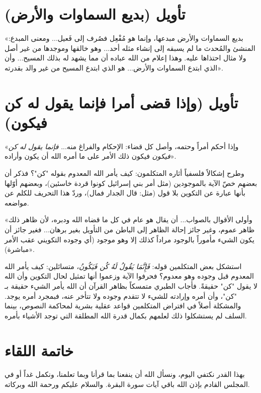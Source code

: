 \separator

\section{تأويل (بديع السماوات والأرض)}
 «بديع السماوات والأرض مبدعها، وإنما هو مُفْعِل فصُرف إلى فَعيل... ومعنى المبدع: المنشئ والمُحدث ما لم يسبقه إلى إنشاء مثله أحد... وهو خالقها وموجدها من غير أصل ولا مثال احتذاها عليه. وهذا إعلام من الله عباده أن مما يشهد له بذلك المسيح... وأن الذي ابتدع السماوات والأرض... هو الذي ابتدع المسيح من غير والد بقدرته».

\separator

\section{تأويل (وإذا قضى أمرا فإنما يقول له كن فيكون)}
 «وإذا أحكم أمراً وحتمه، وأصل كل قضاء: الإحكام والفراغ منه... \textit{فإنما يقول له كن فيكون} فيكون ذلك الأمر على ما أمره الله أن يكون وأراده».

وطرح  إشكالاً فلسفياً أثاره المتكلمون: كيف يأمر الله المعدوم بقوله "كن"؟
فذكر أن بعضهم خصّ الآية بالموجودين (مثل أمر بني إسرائيل كونوا قردة خاسئين)، وبعضهم أوّلها بأنها عبارة عن التكوين بلا قول (مثل: قال الجدار فمال)، وردّ  هذا التحريف للكلم عن مواضعه.

 «وأولى الأقوال بالصواب... أن يقال هو عام في كل ما قضاه الله ودبره، لأن ظاهر ذلك ظاهر عموم، وغير جائز إحالة الظاهر إلى الباطن من التأويل بغير برهان... فغير جائز أن يكون الشيء مأموراً بالوجود مراداً كذلك إلا وهو موجود (أي وجوده التكويني عقب الأمر مباشرة)».

\begin{fawaid}
استشكل بعض المتكلمين قوله: \textit{فَإِنَّمَا يَقُولُ لَهُ كُن فَيَكُونُ}، متسائلين: كيف يأمر الله المعدوم قبل وجوده وهو معدوم؟ فحرفوا الآية وزعموا أنها تمثيل لحال التكوين وأن الله لا يقول "كن" حقيقةً. فأجاب الطبري متمسكاً بظاهر القرآن أن الله يأمر الشيء حقيقة بـ "كن"، وأن أمره وإرادته للشيء لا تتقدم وجوده ولا تتأخر عنه، فبمجرد أمره يوجد. والمشكلة أصلاً في افتراض المتكلمين قواعد عقلية بشرية لمحاكمة النصوص، بينما السلف لم يستشكلوا ذلك لعلمهم بكمال قدرة الله المطلقة التي توجد الأشياء بأمره.
\end{fawaid}

\separator

\section{خاتمة اللقاء}
بهذا القدر نكتفي اليوم، ونسأل الله أن ينفعنا بما قرأنا وبما تعلمنا، ونكمل غداً أو في المجلس القادم بإذن الله باقي آيات سورة البقرة. والسلام عليكم ورحمة الله وبركاته.
